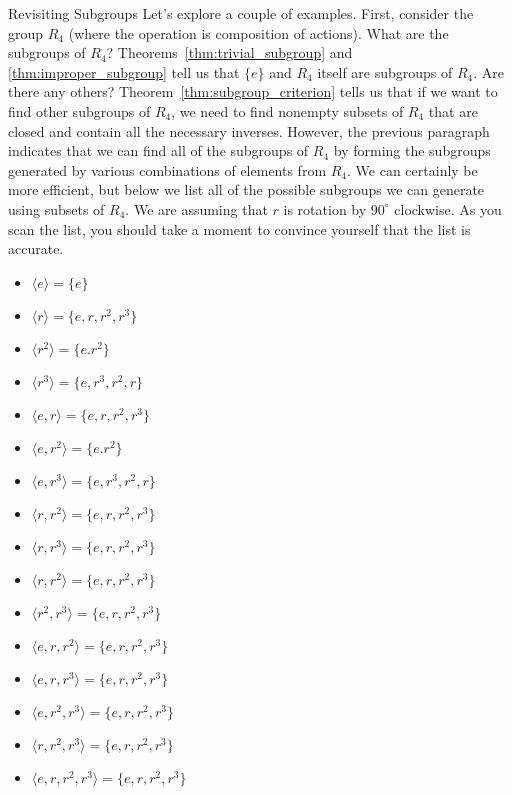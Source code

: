 \begin{section}{Revisiting Subgroups}
Let's explore a couple of examples.  First, consider the group $R_4$ (where the operation is composition of actions).  What are the subgroups of $R_4$?  Theorems~\ref{thm:trivial_subgroup} and \ref{thm:improper_subgroup} tell us that $\{e\}$ and $R_4$ itself are subgroups of $R_4$.  Are there any others?  Theorem~\ref{thm:subgroup_criterion} tells us that if we want to find other subgroups of $R_4$, we need to find nonempty subsets of $R_4$ that are closed and contain all the necessary inverses.  However, the previous paragraph indicates that we can find all of the subgroups of $R_4$ by forming the subgroups generated by various combinations of elements from $R_4$.  We can certainly be more efficient, but below we list all of the possible subgroups we can generate using subsets of $R_4$.  We are assuming that $r$ is rotation by $90^{\circ}$ clockwise.  As you scan the list, you should take a moment to convince yourself that the list is accurate.
\begin{multicols}{2}
\begin{itemize}
\item[] $\langle e \rangle = \{e\}$
\item[] $\langle r \rangle  = \{e,r,r^2,r^3\}$
\item[] $\langle r^2 \rangle  = \{e.r^2\}$
\item[] $\langle r^3 \rangle  = \{e,r^3,r^2,r\}$
\item[] $\langle e,r \rangle  = \{e,r,r^2,r^3\}$
\item[] $\langle e,r^2 \rangle  = \{e.r^2\}$
\item[] $\langle e,r^3 \rangle  = \{e,r^3,r^2,r\}$
\item[] $\langle r,r^2 \rangle  = \{e,r,r^2,r^3\}$
\item[] $\langle r,r^3 \rangle  = \{e,r,r^2,r^3\}$
\item[] $\langle r,r^2 \rangle  = \{e,r,r^2,r^3\}$
\item[] $\langle r^2,r^3 \rangle  = \{e,r,r^2,r^3\}$
\item[] $\langle e,r,r^2 \rangle  = \{e,r,r^2,r^3\}$
\item[] $\langle e,r,r^3 \rangle  = \{e,r,r^2,r^3\}$
\item[] $\langle e,r^2,r^3 \rangle  = \{e,r,r^2,r^3\}$
\item[] $\langle r,r^2,r^3 \rangle  = \{e,r,r^2,r^3\}$
\item[] $\langle e,r,r^2,r^3 \rangle = \{e,r,r^2,r^3\}$
\end{itemize}
\end{multicols}

\end{section}
